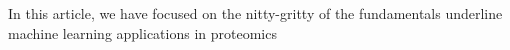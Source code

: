 In this article, we have focused on the nitty-gritty of the fundamentals underline machine learning applications in proteomics